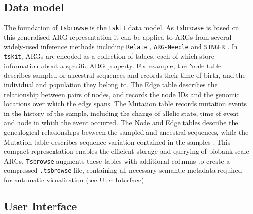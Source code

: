 \documentclass[unnumsec,webpdf,contemporary,large,namedate]{oup-authoring-template}%
\begin{document}
\subsection{Data model} \label{subsec:Data_Model} The foundation of
\texttt{tsbrowse} is the \texttt{tskit} data model. As \texttt{tsbrowse} is
based on this generalised ARG representation \citep{Wong2024} it can be applied
to ARGs from several widely-used inference methods including \texttt{Relate}
\citep{Speidel2019}, \texttt{ARG-Needle} \citep{Zhang2023} and \texttt{SINGER}
\citep{Deng2024.03.16.585351}. In \texttt{tskit}, ARGs are encoded as a
collection of tables, each of which store information about a specific ARG
property. For example, the Node table describes sampled or ancestral sequences
and records their time of birth, and the individual and population they belong
to. The Edge table describes the relationship between pairs of nodes, and
records the node IDs and the genomic locations over which the edge spans. The
Mutation table records mutation events in the history of the sample, including
the change of allelic state, time of event and node in which the event
occurred. The Node and Edge tables describe the genealogical relationships
between the sampled and ancestral sequences, while the Mutation table describes
sequence variation contained in the samples \citep{Ralph2020}. This compact
representation enables the efficient storage and querying of biobank-scale
ARGs. \texttt{Tsbrowse} augments these tables with additional columns to create
a compressed \texttt{.tsbrowse} file, containing all necessary semantic
metadata required for automatic visualisation (see
\hyperref[subsec:User_Interface]{User Interface}). 

\subsection{User Interface}
\label{subsec:User_Interface}
\end{document}
